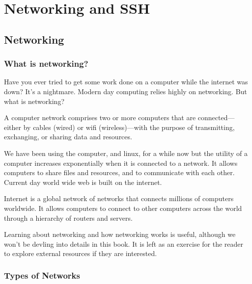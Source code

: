 \setchapterpreamble[u]{\margintoc}
\chapter{Networking and SSH}


\section{Networking}

\subsection{What is networking?}

Have you ever tried to get some work done on a computer
while the internet was down? It's a nightmare.
Modern day computing relies highly on networking.
But what is networking?

\begin{definition}[Networking]
A computer network comprises two or more computers
that are connected—either by cables (wired) or wifi
(wireless)—with the purpose of transmitting, exchanging,
or sharing data and resources.
\end{definition}

We have been using the computer, and linux, for a while now
but the utility of a computer increases exponentially when
it is connected to a network. It allows computers to share
files and resources, and to communicate with each other.
Current day world wide web is built on the internet.

\begin{definition}[Internet]
Internet is a global network of networks that connects
millions of computers worldwide. It allows computers to
connect to other computers across the world through a
hierarchy of routers and servers.
\end{definition}

Learning about networking and how networking works
is useful, although we won't be devling into details
in this book. It is left as an exercise for the reader
to explore external resources if they are interested.


\subsection{Types of Networks}

